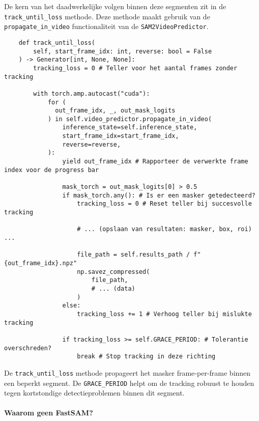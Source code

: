 De kern van het daadwerkelijke volgen binnen deze segmenten zit in de \texttt{track\_until\_loss} methode. 
Deze methode maakt gebruik van de \texttt{propagate\_in\_video} functionaliteit van de \texttt{SAM2VideoPredictor}.

\begin{listing}[H]
  \begin{verbatim}
    def track_until_loss(
        self, start_frame_idx: int, reverse: bool = False
    ) -> Generator[int, None, None]:
        tracking_loss = 0 # Teller voor het aantal frames zonder tracking

        with torch.amp.autocast("cuda"):
            for (
              out_frame_idx, _, out_mask_logits
            ) in self.video_predictor.propagate_in_video(
                inference_state=self.inference_state,
                start_frame_idx=start_frame_idx,
                reverse=reverse,
            ):
                yield out_frame_idx # Rapporteer de verwerkte frame index voor de progress bar

                mask_torch = out_mask_logits[0] > 0.5
                if mask_torch.any(): # Is er een masker getedecteerd?
                    tracking_loss = 0 # Reset teller bij succesvolle tracking

                    # ... (opslaan van resultaten: masker, box, roi) ...

                    file_path = self.results_path / f"{out_frame_idx}.npz"
                    np.savez_compressed(
                        file_path,
                        # ... (data)
                    )
                else:
                    tracking_loss += 1 # Verhoog teller bij mislukte tracking

                if tracking_loss >= self.GRACE_PERIOD: # Tolerantie overschreden?
                    break # Stop tracking in deze richting

  \end{verbatim}
  \caption[Gelokaliseerde tracking met tolerantieperiode]{
    De \texttt{track\_until\_loss} methode propageert het masker frame-per-frame binnen een beperkt segment. 
    De \texttt{GRACE\_PERIOD} helpt om de tracking robuust te houden tegen kortstondige detectieproblemen binnen dit segment.
  }
\end{listing}

\paragraph{Waarom geen FastSAM?}

